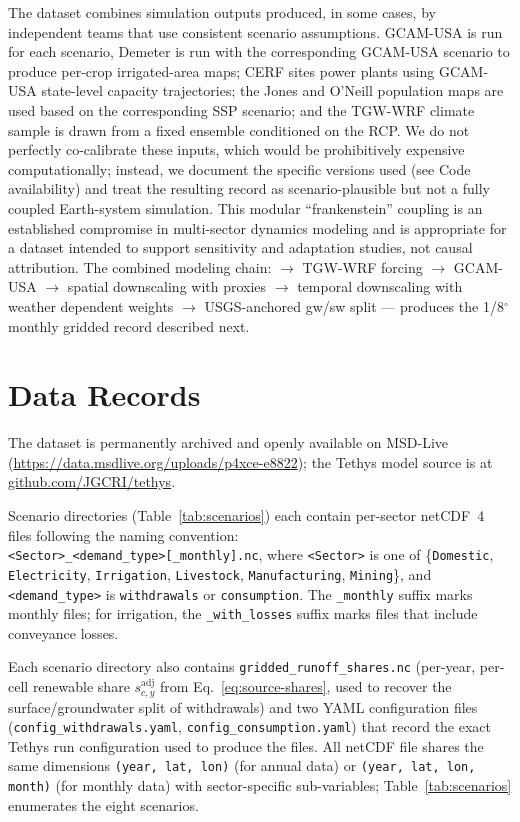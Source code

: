 \documentclass[fleqn,10pt]{wlscirep}
\begin{document}
The dataset combines simulation outputs produced, in some cases, by independent teams that use consistent scenario assumptions.  GCAM-USA is run for each scenario, Demeter is run with the corresponding GCAM-USA scenario to produce per-crop irrigated-area maps; CERF sites power plants using GCAM-USA state-level capacity trajectories; the Jones and O'Neill population maps are used based on the corresponding SSP scenario; and the TGW-WRF climate sample is drawn from a fixed ensemble conditioned on the RCP. We do not perfectly co-calibrate these inputs, which would be prohibitively expensive computationally; instead, we document the specific versions used (see Code availability) and treat the resulting record as scenario-plausible but not a fully coupled  Earth-system simulation. This modular ``frankenstein'' coupling is an established compromise in multi-sector dynamics modeling\cite{Khan2023} and is appropriate for a dataset intended to support sensitivity and adaptation studies, not causal attribution. The combined modeling chain: $\to$ TGW-WRF forcing $\to$ GCAM-USA $\to$ spatial downscaling with proxies $\to$ temporal downscaling with weather dependent weights $\to$ USGS-anchored gw/sw split --- produces the 1/8$^{\circ}$ monthly gridded record described next.

\section*{Data Records}

The dataset is permanently archived and openly available on MSD-Live (\url{https://data.msdlive.org/uploads/p4xce-e8822}); the Tethys model source is at \href{https://github.com/JGCRI/tethys}{github.com/JGCRI/tethys}.

Scenario directories (Table~\ref{tab:scenarios}) each contain per-sector netCDF~4 files following the naming convention:\\\texttt{<Sector>\_<demand\_type>[\_monthly].nc}, where \texttt{<Sector>} is one of \{\texttt{Domestic}, \texttt{Electricity}, \texttt{Irrigation}, \texttt{Livestock}, \texttt{Manufacturing}, \texttt{Mining}\}, and \texttt{<demand\_type>} is \texttt{withdrawals} or \texttt{consumption}. The \texttt{\_monthly} suffix marks monthly files; for irrigation, the \texttt{\_with\_losses} suffix marks files that include conveyance losses.

Each scenario directory also contains \texttt{gridded\_runoff\_shares.nc} (per-year, per-cell renewable share $s^{\mathrm{adj}}_{c,y}$ from Eq.~\ref{eq:source-shares}, used to recover the surface/groundwater split of withdrawals) and two YAML configuration files (\texttt{config\_withdrawals.yaml}, \texttt{config\_consumption.yaml}) that record the exact Tethys run configuration used to produce the files. All netCDF file shares the same dimensions \texttt{(year, lat, lon)} (for annual data) or \texttt{(year, lat, lon, month)} (for monthly data) with sector-specific sub-variables; 
Table~\ref{tab:scenarios} enumerates the eight scenarios. 
\end{document}
